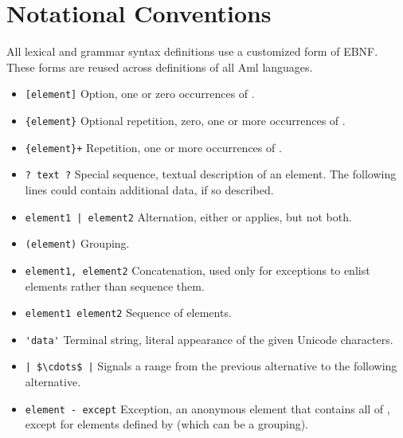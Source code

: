 \section{Notational Conventions}

All lexical and grammar syntax definitions use a customized form of EBNF. These forms are reused across definitions of all Aml languages. 

\begin{itemize}
  \item \lstinline![element]! \newline
    Option, one or zero occurrences of . 
  \item \lstinline!{element}! \newline
    Optional repetition, zero, one or more occurrences of .
  \item \lstinline!{element}+! \newline
    Repetition, one or more occurrences of .
  \item \lstinline!? text ?! \newline
    Special sequence, textual description of an element. The following lines could contain additional data, if so described.
  \item \lstinline!element1 | element2! \newline
    Alternation, either  or  applies, but not both. 
  \item \lstinline!(element)! \newline
    Grouping. 
  \item \lstinline!element1, element2! \newline
    Concatenation, used only for exceptions to enlist elements rather than sequence them. 
  \item \lstinline!element1 element2! \newline
    Sequence of elements.
  \item \lstinline!'data'! \newline
    Terminal string, literal appearance of the given Unicode characters. 
  \item \lstinline!| $\cdots$ |! \newline
    Signals a range from the previous alternative to the following alternative. 
  \item \lstinline!element - except! \newline
    Exception, an anonymous element that contains all of , except for elements defined by  (which can be a grouping). 

\end{itemize}
